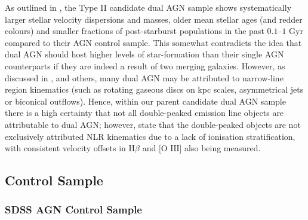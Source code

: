 As outlined in \cite{Liu_2009}, the Type II candidate dual AGN sample shows systematically larger stellar velocity dispersions and masses, older mean stellar ages (and redder colours) and smaller fractions of post-starburst populations in the past $0.1–1$ Gyr compared to their AGN control sample. This somewhat contradicts the idea that dual AGN should host higher levels of star-formation than their single AGN counterparts if they are indeed a result of two merging galaxies. However, as discussed in \cite{Liu_2009}, and others, many dual AGN may be attributed to narrow-line region kinematics (such as rotating gaseous discs on kpc scales, asymmetrical jets or biconical outflows). Hence, within our parent candidate dual AGN sample there is a high certainty that not all double-peaked emission line objects are attributable to dual AGN; however, \cite{Liu_2009} state that the double-peaked objects are not exclusively attributed NLR kinematics due to a lack of ionisation stratification, with consistent velocity offsets in $\text{H}\beta$ and $\text{[O III]}$ also being measured.

\subsection{Control Sample}

\subsubsection{SDSS AGN Control Sample}

